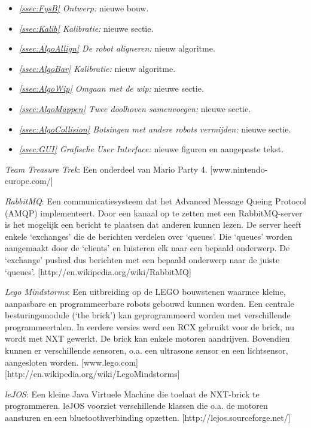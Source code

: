 \documentclass[tt3]{penoverslag}
\begin{document}
\begin{itemize}
\item \textit{\ref{ssec:FysB} Ontwerp:} nieuwe bouw.
\item \textit{\ref{ssec:Kalib} Kalibratie:} nieuwe sectie.
\item \textit{\ref{ssec:AlgoAllign} De robot aligneren:} nieuw algoritme.
\item \textit{\ref{ssec:AlgoBar} Kalibratie:} nieuw algoritme.
\item \textit{\ref{ssec:AlgoWip} Omgaan met de wip:} nieuwe sectie.
\item \textit{\ref{ssec:AlgoMappen} Twee doolhoven samenvoegen:} nieuwe sectie.
\item \textit{\ref{ssec:AlgoCollision} Botsingen met andere robots vermijden:} nieuwe sectie.
\item \textit{\ref{ssec:GUI} Grafische User Interface:} nieuwe figuren en aangepaste tekst.
\end{itemize}


\begin{thebibliography}{9}

\textit{Team Treasure Trek}: Een onderdeel van Mario Party 4. \mbox{[www.nintendo-europe.com/]}

\textit{RabbitMQ}: Een communicatiesysteem dat het Advanced Message Queing Protocol (AMQP) implementeert. Door een kanaal op te zetten met een RabbitMQ-server is het mogelijk een bericht te plaatsen dat anderen kunnen lezen. De server heeft enkele `exchanges' die de berichten verdelen over `queues'. Die `queues' worden aangemaakt door de `clients' en luisteren elk naar een bepaald onderwerp. De `exchange' pushed dus berichten met een bepaald onderwerp naar de juiste `queues'.
\mbox{[http://en.wikipedia.org/wiki/RabbitMQ]}

\textit{Lego Mindstorms}:  Een uitbreiding op de LEGO bouwstenen waarmee kleine, aanpasbare en programmeerbare robots gebouwd kunnen worden. Een centrale besturingsmodule (`the brick') kan geprogrammeerd worden met verschillende programmeertalen. In eerdere versies werd een RCX gebruikt voor de brick, nu wordt met NXT gewerkt. De brick kan enkele motoren aandrijven. Bovendien kunnen er verschillende sensoren, o.a. een ultrasone sensor en een lichtsensor, aangesloten worden.  \mbox{[www.lego.com]} \mbox{[http://en.wikipedia.org/wiki/Lego\textendash Mindstorms]}

\textit{leJOS}: Een kleine Java Virtuele Machine die toelaat de NXT-brick te programmeren. leJOS voorziet verschillende klassen die o.a. de motoren aansturen en een bluetoothverbinding opzetten.  \mbox{[http://lejos.sourceforge.net/]}



\end{thebibliography}
\end{document}
